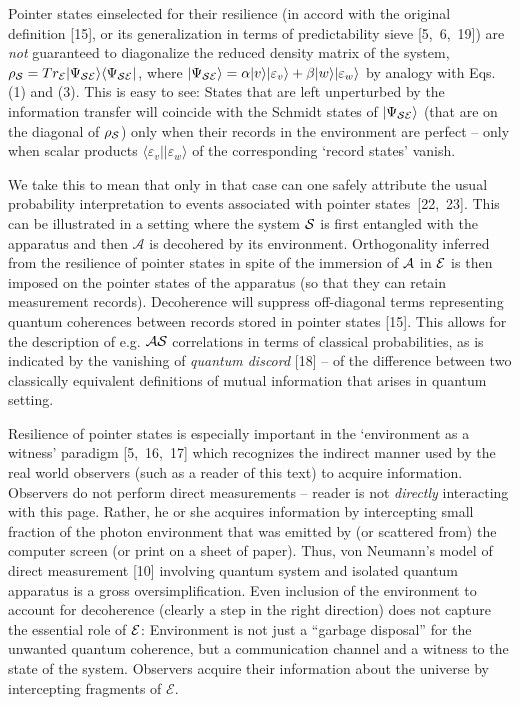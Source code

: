 \documentclass[aps,twocolumn,pra,onecolumn,12pt]{revtex4}
\newcommand{\bra}[1]    {\langle #1|}
\newcommand{\ket}[1]    {| #1 \rangle}
\newcommand{\cA}        {{\mathcal A}}
\newcommand{\cE}        {{\mathcal E}}
\newcommand{\+}         {\dagger}
\begin{document}
Pointer states einselected for their resilience (in accord with the original definition [15], or its generalization in terms of predictability sieve [5,~6,~19]) are {\em not} guaranteed to 
diagonalize the reduced density matrix  of the system, $\rho_{\cal S}=Tr_{\cal E} \ket {\Psi_{\cal SE}} \bra {\Psi_{\cal SE}}$, where $\ket {\Psi_{\cal SE}}= \alpha \ket v \ket {\varepsilon_v}+ \beta \ket w \ket {\varepsilon_w}$ by analogy with Eqs. (1) and (3). This is easy to see: States that are left unperturbed by the information transfer will coincide with the Schmidt states of 
$\ket {\Psi_{\cal SE}}$ (that are on the diagonal of  $\rho_{\cal S}$) only when their records in the  environment are perfect -- only when scalar products $\bra {\varepsilon_v} \ket {\varepsilon_w}$ of the corresponding `record states' 
vanish.

We take this to mean that only in that case can one safely attribute the usual probability interpretation to 
events associated with pointer states~[22,~23]. This can be illustrated in a setting where the system 
${\cal S}$ is first entangled with the apparatus and then $\cA$ is decohered by its environment. 
Orthogonality inferred from the resilience of pointer states in spite of the immersion of ${\cal A}$
in ${\cal E}$ is then imposed on the pointer states of the apparatus (so that they can retain measurement records). Decoherence will suppress off-diagonal terms representing quantum coherences between records stored in pointer states [15]. This allows for the description of e.g. ${\cal AS}$ correlations in terms of classical probabilities, as is indicated by the vanishing of {\it quantum discord} [18] -- of the difference between two classically equivalent definitions of mutual information that arises in quantum setting.

Resilience of pointer states is especially important in the `environment as a witness' paradigm [5,~16,~17] which recognizes the indirect manner used by the real world observers 
(such as a reader of this text) to acquire information. Observers do not perform direct 
measurements -- reader is not {\em directly} interacting with this page. Rather, he or she acquires information by intercepting small fraction of the photon environment that was emitted by 
(or scattered from) the computer screen (or print on a sheet of paper). Thus, von Neumann's model of direct measurement [10] involving quantum system and isolated quantum apparatus is a gross oversimplification. Even inclusion of the environment to account for 
decoherence (clearly a step in the right direction) does not capture the essential role of 
${\cal E}$: Environment is not just a ``garbage disposal'' for the unwanted quantum coherence, but a communication channel and a witness to the state of the system. Observers acquire their information about the universe by intercepting fragments of $\cE$.
\end{document}
